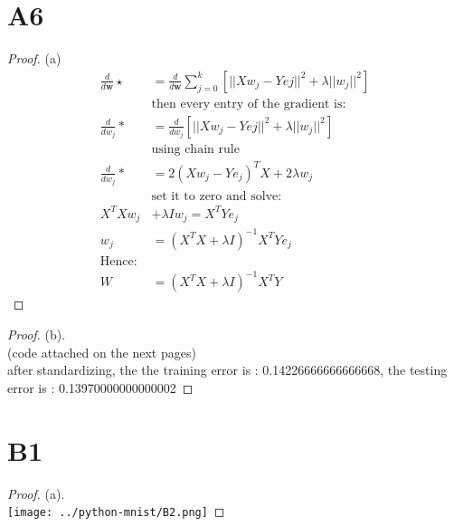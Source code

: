 \documentclass[12pt]{article}
\begin{document}
\section*{A6}
\begin{proof}
        (a)\\
\[
        \begin{aligned}
             \frac{d}{d\mathbf{w}}   \star &=\frac{d}{d\mathbf{w}} \sum_{j=0}^{k} [||Xw_j - Yej||^2 + \lambda ||w_j||^2] \\    
                &\text{then every entry of the gradient is: }\\
             \frac{d}{dw_j} * &= \frac{d}{dw_j}[||Xw_j - Yej||^2 + \lambda ||w_j||^2] \\    
                &\text{using chain rule }\\
             \frac{d}{dw_j} * &= 2(Xw_j-Ye_j)^{T} X +2\lambda w_j\\ 
                              &\text{set it to zero and solve: }\\
             X^TXw_j &+ \lambda I w_j = X^TYe_j\\
             w_j &= ( X^TX + \lambda I)^{-1} X^{T}Ye_j\\
             \text{Hence: }\\
W &= ( X^TX + \lambda I)^{-1} X^{T}Y
        \end{aligned}
\]
\end{proof}

\begin{proof}
        (b).\\
        (code attached on the next pages)\\
        after standardizing, the the training error is : 0.14226666666666668, the testing error is : 0.13970000000000002
\end{proof}

\newpage
\section*{B1}

\begin{proof}
        (a).\\
        \texttt{[image: ../python-mnist/B2.png]}
\end{proof}
\end{document}
